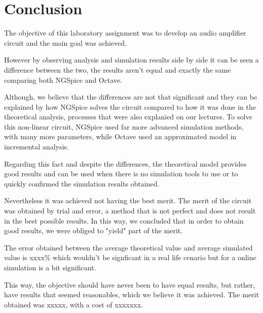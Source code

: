 \newpage
\section{Conclusion}
\label{sec:conclusion}

\hspace{0,5cm} The objective of this laboratory assignment was to develop an audio amplifier circuit and the main goal was achieved. 

\par However by observing analysis and simulation results side by side it can be seen a difference between the two, the results aren't equal and exactly the same comparing both NGSpice and Octave. 
\par Although, we believe that the differences are not that significant and they can be explained by how NGSpice solves the circuit compared to how it was done in the theoretical analysis, processes that were also explanied on our lectures. To solve this non-linear circuit, NGSpice used far more advanced simulation methods, with many more parameters, while Octave used an approximated model in incremental analysis. 
\par Regarding this fact and despite the differences, the theoretical model provides good results and can be used when there is no simulation tools to use or to quickly confirmed the simulation results obtained.

\par Nevertheless it was achieved not having the best merit. The merit of the circuit was obtained by trial and error, a method that is not perfect and does not result in the best possible results. In this way, we concluded that in order to obtain good results, we were obliged to "yield" part of the merit.

\par The error obtained between the average theoretical value and average simulated value is xxxx\% which wouldn't be signficant in a real life cenario but for a online simulation is a bit significant.

\par This way, the objective should have never been to have equal results, but rather, have results that seemed reasonables, which we believe it was achieved. The merit obtained was xxxxx, with a cost of xxxxxxx.



